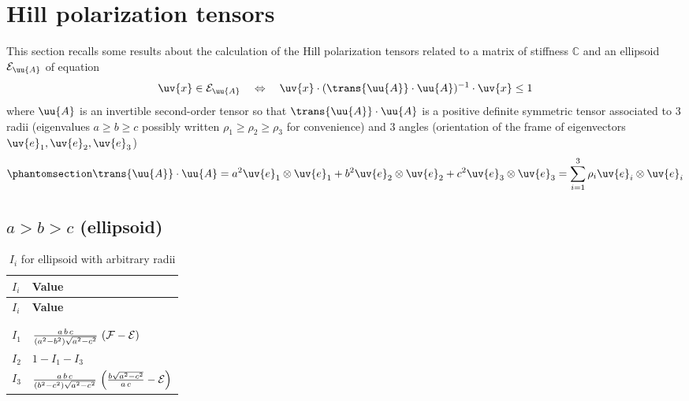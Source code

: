 \documentclass[
  letterpaper,
  DIV=11,
  numbers=noendperiod]{scrreprt}
\begin{document}
\chapter{Hill polarization tensors}\label{sec-hill_elas}

This section recalls some results about the calculation of the Hill
polarization tensors related to a matrix of stiffness \(\mathbb{C}\) and
an ellipsoid \(\mathcal{E}_{\uu{A}}\) of equation \[
\uv{x}\in\mathcal{E}_{\uu{A}}
\quad\Leftrightarrow\quad
\uv{x}\cdot(\trans{\uu{A}}\cdot\uu{A})^{-1}\cdot\uv{x}\leq 1
\] where \(\uu{A}\) is an invertible second-order tensor so that
\(\trans{\uu{A}}\cdot\uu{A}\) is a positive definite symmetric tensor
associated to 3 radii (eigenvalues \(a\geq b \geq c\) possibly written
\(\rho_1 \geq \rho_2 \geq \rho_3\) for convenience) and 3 angles
(orientation of the frame of eigenvectors
\(\uv{e}_1, \uv{e}_2, \uv{e}_3\))
\begin{equation}\phantomsection\label{eq-ellipsoid}{
\trans{\uu{A}}\cdot\uu{A}=a^2 \uv{e}_1\otimes\uv{e}_1 + b^2 \uv{e}_2\otimes\uv{e}_2 + c^2 \uv{e}_3\otimes\uv{e}_3 = \sum_{i=1}^3 \rho_i \uv{e}_i\otimes\uv{e}_i
}\end{equation}

\section{\texorpdfstring{\(a>b>c\)
(ellipsoid)}{a\textgreater b\textgreater c (ellipsoid)}}

\begin{longtable}[]{@{}
  >{\centering\arraybackslash}p{}
  >{\centering\arraybackslash}p{}@{}}
\toprule\noalign{}
\begin{minipage}[b]{\linewidth}\centering
\(I_i\)
\end{minipage} & \begin{minipage}[b]{\linewidth}\centering
\textbf{Value}
\end{minipage} \\
\midrule\noalign{}
\endfirsthead
\toprule\noalign{}
\begin{minipage}[b]{\linewidth}\centering
\(I_i\)
\end{minipage} & \begin{minipage}[b]{\linewidth}\centering
\textbf{Value}
\end{minipage} \\
\midrule\noalign{}
\endhead
\bottomrule\noalign{}
\tabularnewline
\caption{\(I_i\) for ellipsoid with arbitrary
radii}\label{tbl-Ii}\tabularnewline
\endlastfoot
\(I_1\) &
\(\frac{a\,b\,c}{(a^2-b^2)\sqrt{a^2-c^2}}\,\left({\cal F}-{\cal E}\right)\) \\
\(I_2\) & \(1-I_1-I_3\) \\
\(I_3\) &
\(\frac{a\,b\,c}{(b^2-c^2)\sqrt{a^2-c^2}}\,\left(\frac{b\sqrt{a^2-c^2}}{a\,c}-{\cal E}\right)\) \\
\end{longtable}
\end{document}
